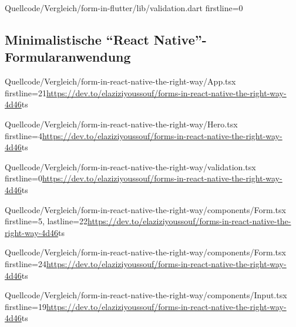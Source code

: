 \begin{alexlisting}{}{}
  {Quellcode/Vergleich/form-in-flutter/lib/validation.dart}
  {firstline=0}
  \label{lst:VergleichFlutterValidation}
\end{alexlisting}

\clearpage
\subsection{Minimalistische \enquote{React Native}-Formularanwendung}
\label{sec:VergleichReactNatveApp}

\begin{fremdeslisting}{}{}
  {Quellcode/Vergleich/form-in-react-native-the-right-way/App.tsx}
  {firstline=21}{\url{https://dev.to/elaziziyoussouf/forms-in-react-native-the-right-way-4d46}}{ts}
  \label{lst:VergleichReactNatveApp}
\end{fremdeslisting}

\begin{fremdeslisting}{}{}
  {Quellcode/Vergleich/form-in-react-native-the-right-way/Hero.tsx}
  {firstline=4}{\url{https://dev.to/elaziziyoussouf/forms-in-react-native-the-right-way-4d46}}{ts}
  \label{lst:VergleichReactNatveHero}
\end{fremdeslisting}

\begin{fremdeslisting}{}{}
  {Quellcode/Vergleich/form-in-react-native-the-right-way/validation.tsx}
  {firstline=0}{\url{https://dev.to/elaziziyoussouf/forms-in-react-native-the-right-way-4d46}}{ts}
  \label{lst:VergleichReactNatveValidation}
\end{fremdeslisting}
 
\begin{fremdeslisting}{}{}
  {Quellcode/Vergleich/form-in-react-native-the-right-way/components/Form.tsx}
  {firstline=5, lastline=22}{\url{https://dev.to/elaziziyoussouf/forms-in-react-native-the-right-way-4d46}}{ts}
  \label{lst:VergleichReactNatveForm}
\end{fremdeslisting}

\begin{fremdeslisting}{}{}
	{Quellcode/Vergleich/form-in-react-native-the-right-way/components/Form.tsx}
	{firstline=24}{\url{https://dev.to/elaziziyoussouf/forms-in-react-native-the-right-way-4d46}}{ts}
	\label{lst:VergleichReactNatveForm2}
\end{fremdeslisting}

\begin{fremdeslisting}{}{}
  {Quellcode/Vergleich/form-in-react-native-the-right-way/components/Input.tsx}
  {firstline=19}{\url{https://dev.to/elaziziyoussouf/forms-in-react-native-the-right-way-4d46}}{ts}
  \label{lst:VergleichReactNatveInput}
\end{fremdeslisting} 
